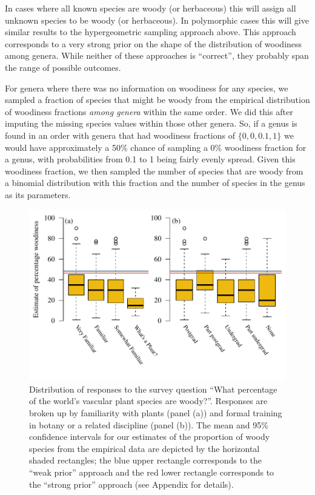 \documentclass[12pt]{article}
\begin{document}
In cases where all known species are woody (or herbaceous) this will
assign all unknown species to be woody (or herbaceous). In polymorphic
cases this will give similar results to the hypergeometric sampling
approach above. This approach corresponds to a very strong prior on
the shape of the distribution of woodiness among genera.
While neither of these approaches is ``correct'', they probably
span the range of possible outcomes.

For genera where there was no information on woodiness for any
species, we sampled a fraction of species that might be woody from the
empirical distribution of woodiness fractions \textit{among genera}
within the same order. We did this after imputing the missing species
values within those other genera. So, if a genus is found in an order
with genera that had woodiness fractions of $\{0, 0, 0.1, 1\}$ we would
have approximately a 50\% chance of sampling a 0\% woodiness fraction
for a genus, with probabilities from 0.1 to 1 being fairly evenly
spread.  Given this woodiness fraction, we then sampled the number of
species that are woody from a binomial distribution with this fraction
and the number of species in the genus as its parameters.





\begin{figure}[p]
  \centering
  \includegraphics{figs/survey-results}
  \caption{Distribution of responses to the survey question ``What
    percentage of the world's vascular plant species are
    woody?''. Responses are broken up by familiarity with plants
    (panel (a)) and formal training in botany or a related discipline
    (panel (b)). The mean and 95\% confidence intervals for our
    estimates of the proportion of woody species from the empirical
    data are depicted by the horizontal shaded rectangles; the blue
    upper rectangle corresponds to the ``weak prior'' approach and the
    red lower rectangle corresponds to the ``strong prior'' approach
    (see Appendix for details).}
  \label{fig:survey}
\end{figure}
\end{document}
